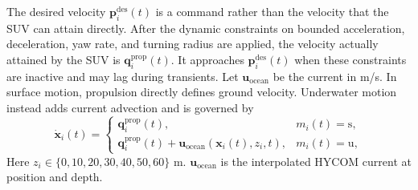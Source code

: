 \documentclass[a4paper,fleqn]{cas-dc}
\begin{document}
The desired velocity \(\mathbf{p}_i^{\mathrm{des}}(t)\) is a command rather
than the velocity that the SUV can attain directly. After the dynamic
constraints on bounded acceleration, deceleration, yaw rate, and turning radius
are applied, the velocity actually attained by the SUV is
\(\mathbf{q}_i^{\mathrm{prop}}(t)\). It approaches
\(\mathbf{p}_i^{\mathrm{des}}(t)\) when these constraints are inactive and may
lag during transients. Let \(\mathbf{u}_{\mathrm{ocean}}\) be the current in
m/s. In surface motion, propulsion directly defines ground velocity. Underwater
motion instead adds current advection and is governed by
\begin{equation}
\dot{\mathbf{x}}_i(t)=
\begin{cases}
\mathbf{q}_i^{\mathrm{prop}}(t), & m_i(t)=\mathrm{s},\\[1mm]
\mathbf{q}_i^{\mathrm{prop}}(t)+
\mathbf{u}_{\mathrm{ocean}}
\left(\mathbf{x}_i(t),z_i,t\right), & m_i(t)=\mathrm{u},
\end{cases}
\label{eq:platform_motion}
\end{equation}
Here \(z_i\in\{0,10,20,30,40,50,60\}\) m.
\(\mathbf{u}_{\mathrm{ocean}}\) is the interpolated HYCOM current at position
and depth.
\end{document}
